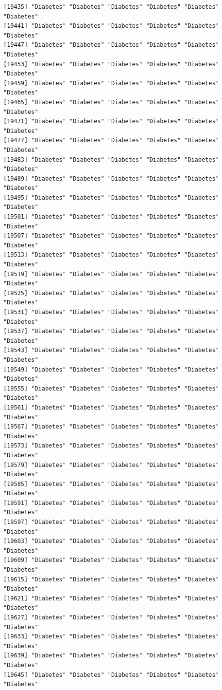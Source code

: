 \documentclass[
  letterpaper,
  DIV=11,
  numbers=noendperiod]{scrartcl}
\begin{document}
\begin{verbatim}
[19435] "Diabetes" "Diabetes" "Diabetes" "Diabetes" "Diabetes" "Diabetes"
[19441] "Diabetes" "Diabetes" "Diabetes" "Diabetes" "Diabetes" "Diabetes"
[19447] "Diabetes" "Diabetes" "Diabetes" "Diabetes" "Diabetes" "Diabetes"
[19453] "Diabetes" "Diabetes" "Diabetes" "Diabetes" "Diabetes" "Diabetes"
[19459] "Diabetes" "Diabetes" "Diabetes" "Diabetes" "Diabetes" "Diabetes"
[19465] "Diabetes" "Diabetes" "Diabetes" "Diabetes" "Diabetes" "Diabetes"
[19471] "Diabetes" "Diabetes" "Diabetes" "Diabetes" "Diabetes" "Diabetes"
[19477] "Diabetes" "Diabetes" "Diabetes" "Diabetes" "Diabetes" "Diabetes"
[19483] "Diabetes" "Diabetes" "Diabetes" "Diabetes" "Diabetes" "Diabetes"
[19489] "Diabetes" "Diabetes" "Diabetes" "Diabetes" "Diabetes" "Diabetes"
[19495] "Diabetes" "Diabetes" "Diabetes" "Diabetes" "Diabetes" "Diabetes"
[19501] "Diabetes" "Diabetes" "Diabetes" "Diabetes" "Diabetes" "Diabetes"
[19507] "Diabetes" "Diabetes" "Diabetes" "Diabetes" "Diabetes" "Diabetes"
[19513] "Diabetes" "Diabetes" "Diabetes" "Diabetes" "Diabetes" "Diabetes"
[19519] "Diabetes" "Diabetes" "Diabetes" "Diabetes" "Diabetes" "Diabetes"
[19525] "Diabetes" "Diabetes" "Diabetes" "Diabetes" "Diabetes" "Diabetes"
[19531] "Diabetes" "Diabetes" "Diabetes" "Diabetes" "Diabetes" "Diabetes"
[19537] "Diabetes" "Diabetes" "Diabetes" "Diabetes" "Diabetes" "Diabetes"
[19543] "Diabetes" "Diabetes" "Diabetes" "Diabetes" "Diabetes" "Diabetes"
[19549] "Diabetes" "Diabetes" "Diabetes" "Diabetes" "Diabetes" "Diabetes"
[19555] "Diabetes" "Diabetes" "Diabetes" "Diabetes" "Diabetes" "Diabetes"
[19561] "Diabetes" "Diabetes" "Diabetes" "Diabetes" "Diabetes" "Diabetes"
[19567] "Diabetes" "Diabetes" "Diabetes" "Diabetes" "Diabetes" "Diabetes"
[19573] "Diabetes" "Diabetes" "Diabetes" "Diabetes" "Diabetes" "Diabetes"
[19579] "Diabetes" "Diabetes" "Diabetes" "Diabetes" "Diabetes" "Diabetes"
[19585] "Diabetes" "Diabetes" "Diabetes" "Diabetes" "Diabetes" "Diabetes"
[19591] "Diabetes" "Diabetes" "Diabetes" "Diabetes" "Diabetes" "Diabetes"
[19597] "Diabetes" "Diabetes" "Diabetes" "Diabetes" "Diabetes" "Diabetes"
[19603] "Diabetes" "Diabetes" "Diabetes" "Diabetes" "Diabetes" "Diabetes"
[19609] "Diabetes" "Diabetes" "Diabetes" "Diabetes" "Diabetes" "Diabetes"
[19615] "Diabetes" "Diabetes" "Diabetes" "Diabetes" "Diabetes" "Diabetes"
[19621] "Diabetes" "Diabetes" "Diabetes" "Diabetes" "Diabetes" "Diabetes"
[19627] "Diabetes" "Diabetes" "Diabetes" "Diabetes" "Diabetes" "Diabetes"
[19633] "Diabetes" "Diabetes" "Diabetes" "Diabetes" "Diabetes" "Diabetes"
[19639] "Diabetes" "Diabetes" "Diabetes" "Diabetes" "Diabetes" "Diabetes"
[19645] "Diabetes" "Diabetes" "Diabetes" "Diabetes" "Diabetes" "Diabetes"

\end{verbatim}
\end{document}

